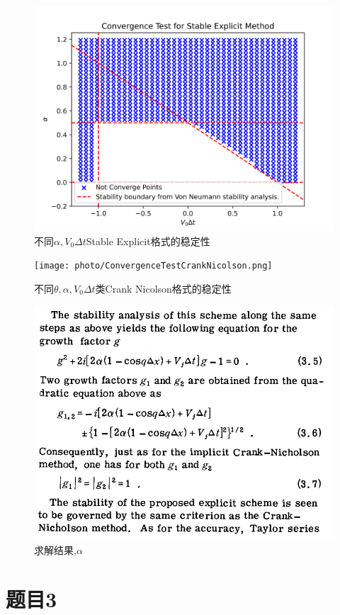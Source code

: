 \documentclass[11pt]{article}
\begin{document}
\begin{figure}[H]
  \centering
  \includegraphics[width=0.8\linewidth]{photo/ConvergenceTestStableExplicit.png}
  \caption{不同$\alpha,V_0 \Delta t$Stable Explicit格式的稳定性}
  \label{fig:8}
\end{figure}


\begin{figure}[H]
  \centering
  \texttt{[image: photo/ConvergenceTestCrankNicolson.png]}
  \caption{不同$\theta,\alpha,V_0 \Delta t$类Crank Nicolson格式的稳定性}
  \label{fig:9}
\end{figure}

\begin{figure}[H]
  \centering
  \includegraphics[width=0.8\linewidth]{photo/figp3.png}
  \caption{求解结果,$\alpha$}
  \label{fig:p3}
\end{figure}

\section{题目3}
\end{document}
